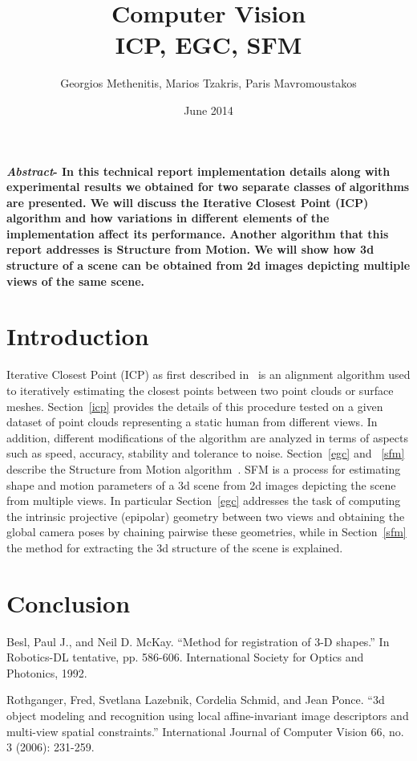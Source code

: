 \documentclass[11pt,twocolumn]{article}
\title{Computer Vision\\ICP, EGC, SFM}
\author{Georgios Methenitis, Marios Tzakris, Paris Mavromoustakos}
\affil{University of Amsterdam}
\date{June 2014}
\begin{document}
\maketitle

\renewcommand{\labelenumi}{\alph{enumi}.}



\textbf{\textit{Abstract}- In this technical report implementation details along with experimental results we obtained for two separate classes of algorithms are presented. We will discuss the Iterative Closest Point (ICP) algorithm and how variations in different elements of the implementation affect its performance. Another algorithm that this report addresses is Structure from Motion. We will show how 3d structure of a scene can be obtained from 2d images depicting multiple views of the same scene.}


\section{Introduction}
\label{introduction}
Iterative Closest Point (ICP) as first described in~\cite{icp} is an alignment algorithm used to iteratively estimating the closest points between two point clouds or surface meshes. Section~\ref{icp} provides the details of this procedure tested on a given dataset of point clouds representing a static human from different views. In addition, different modifications of the algorithm are analyzed in terms of aspects such as speed, accuracy, stability and tolerance to noise.
Section~\ref{egc} and ~\ref{sfm} describe the Structure from Motion algorithm~\cite{egc}. SFM is a process for estimating shape and motion parameters of a 3d scene from 2d images depicting the scene from multiple views. In particular Section~\ref{egc} addresses the task of computing the intrinsic projective (epipolar) geometry between two views and obtaining the global camera poses by chaining pairwise these geometries, while in Section~\ref{sfm} the method for extracting the 3d structure of the scene is explained.











\section{Conclusion}
\label{conclusion}


\begin{thebibliography}{9}

Besl, Paul J., and Neil D. McKay. ``Method for registration of 3-D shapes.'' In Robotics-DL tentative, pp. 586-606. International Society for Optics and Photonics, 1992.

Rothganger, Fred, Svetlana Lazebnik, Cordelia Schmid, and Jean Ponce. ``3d object modeling and recognition using local affine-invariant image descriptors and multi-view spatial constraints.'' International Journal of Computer Vision 66, no. 3 (2006): 231-259.

\end{thebibliography}
\end{document}

